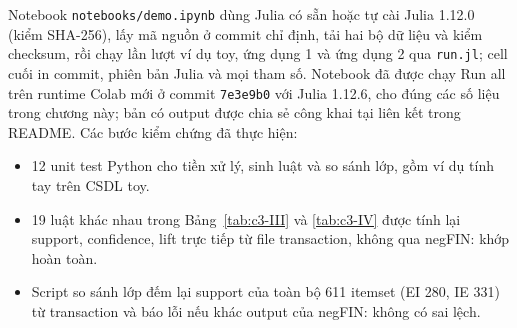Notebook \nolinkurl{notebooks/demo.ipynb} dùng Julia có sẵn hoặc tự cài Julia 1.12.0 (kiểm SHA-256), lấy mã nguồn ở commit chỉ định, tải hai bộ dữ liệu và kiểm checksum, rồi chạy lần lượt ví dụ toy, ứng dụng 1 và ứng dụng 2 qua \texttt{run.jl}; cell cuối in commit, phiên bản Julia và mọi tham số. Notebook đã được chạy Run all trên runtime Colab mới ở commit \texttt{7e3e9b0} với Julia 1.12.6, cho đúng các số liệu trong chương này; bản có output được chia sẻ công khai tại liên kết trong README. Các bước kiểm chứng đã thực hiện:

\begin{itemize}
\tightlist
\item
  12 unit test Python cho tiền xử lý, sinh luật và so sánh lớp, gồm ví dụ tính tay trên CSDL toy.
\item
  19 luật khác nhau trong Bảng~\ref{tab:c3-III} và \ref{tab:c3-IV} được tính lại support, confidence, lift trực tiếp từ file transaction, không qua negFIN: khớp hoàn toàn.
\item
  Script so sánh lớp đếm lại support của toàn bộ 611 itemset (EI 280, IE 331) từ transaction và báo lỗi nếu khác output của negFIN: không có sai lệch.
\end{itemize}
